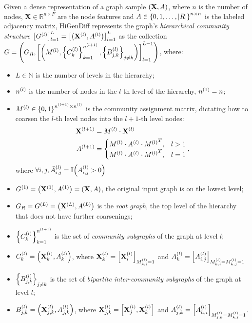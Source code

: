 Given a dense representation of a graph sample $\of{\mathbf{X},A}$, where $n$ is the number of nodes, $\mathbf{X} \in \mathbb{R}^{n \times F}$ are the node features and $A \in \offf{0,1,\dots,\abs{R}}^{n \times n}$ is the labeled adjacency matrix, HiGenDiff represents the graph's \emph{hierarchical community structure} $\off{G^{\of{l}}}_{l=1}^{L}=\off{\of{\mathbf{X}^{\of{l}},A^{\of{l}}}}_{l=1}^{L}$ as the collection $G=\of{G_R,\off{\of{M^{\of{l}}, \offf{C^{\of{l}}_{k}}_{k=1}^{n^{\of{l+1}}},\offf{B^{\of{l}}_{j,k}}_{j \neq k}}}_{l=1}^{L-1}}$, where:
\begin{itemize}
    \item $L \in \mathbb{N}$ is the number of levels in the hierarchy;
    \item $n^{\of{l}}$ is the number of nodes in the $l$-th level of the hierarchy, $n^{\of{1}}=n$;
    \item $M^{\of{l}} \in \offf{0,1}^{n^{\of{l+1}} \times n^{\of{l}}}$ is the community assignment matrix, dictating how to coarsen the $l$-th level nodes into the $l+1$-th level nodes:
    \begin{align}
        \begin{split}
            \mathbf{X}^{\of{l+1}}&=M^{\of{l}} \cdot \mathbf{X}^{\of{l}} \\
            A^{\of{l+1}}&=\begin{cases}
                M^{\of{l}} \cdot A^{\of{l}} \cdot {M^{\of{l}}}^T, & l>1 \\
                M^{\of{l}} \cdot \bar{A}^{\of{l}} \cdot {M^{\of{l}}}^T, & l=1
            \end{cases},
        \end{split}
    \end{align}
    where $\forall i,j, \bar{A}^{\of{l}}_{i,j}=\mathbb{I}\of{A^{\of{l}}_{i,j}>0}$
    \item $G^{\of{1}}=\of{\mathbf{X}^{\of{1}},A^{\of{1}}}=\of{\mathbf{X},A}$, the original input graph is on the lowest level;
    \item $G_R=G^{\of{L}}=\of{\mathbf{X}^{\of{L}}, A^{\of{L}}}$ is the \emph{root graph}, the top level of the hierarchy that does not have further coarsenings;
    \item $\offf{C^{\of{l}}_{k}}_{k=1}^{n^{\of{l+1}}}$ is the set of \emph{community subgraphs} of the graph at level $l$;
    \item $C^{\of{l}}_{k}=\of{\mathbf{X}_k^{\of{l}},A_k^{\of{l}}}$, where $\mathbf{X}_k^{\of{l}}=\off{\mathbf{X}_i^{\of{l}}}_{M^{\of{l}}_{k,i}=1}$ and $A_k^{\of{l}}=\off{A_{i,j}^{\of{l}}}_{M^{\of{l}}_{k,i}=M^{\of{l}}_{k,j}=1}$
    \item $\offf{B^{\of{l}}_{j,k}}_{j \neq k}$ is the set of \emph{bipartite inter-community subgraphs} of the graph at level $l$;
    \item $B^{\of{l}}_{j,k}=\of{\mathbf{X}_{j,k}^{\of{l}},A_{j,k}^{\of{l}}}$, where $\mathbf{X}_{j,k}^{\of{l}}=\off{\mathbf{X}_{j}^{\of{l}},\mathbf{X}_{k}^{\of{l}}}$ and $A_{j,k}^{\of{l}}=\off{A_{h,i}^{\of{l}}}_{M^{\of{l}}_{j,h}=M^{\of{l}}_{k,i}=1}$.
\end{itemize}

